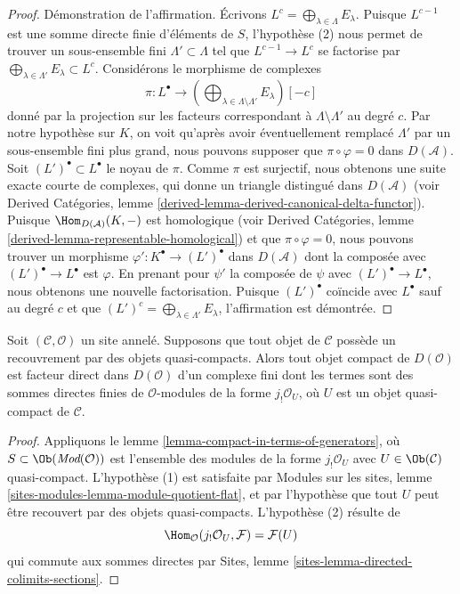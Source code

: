 \begin{proof}
\medskip\noindent
Démonstration de l'affirmation. Écrivons
$L^c = \bigoplus_{\lambda \in \Lambda} E_\lambda$. Puisque $L^{c - 1}$ est
une somme directe finie d'éléments de $S$, l'hypothèse (2) nous permet de
trouver un sous-ensemble fini $\Lambda' \subset \Lambda$ tel que
$L^{c - 1} \to L^c$ se factorise par
$\bigoplus_{\lambda \in \Lambda'} E_\lambda \subset L^c$. Considérons le
morphisme de complexes
$$
\pi :
L^\bullet
\longrightarrow
(\bigoplus\nolimits_{\lambda \in \Lambda \setminus \Lambda'} E_\lambda)[-c]
$$
donné par la projection sur les facteurs correspondant à
$\Lambda \setminus \Lambda'$ au degré $c$. Par notre hypothèse sur $K$, on
voit qu'après avoir éventuellement remplacé $\Lambda'$ par un sous-ensemble
fini plus grand, nous pouvons supposer que $\pi \circ \varphi = 0$ dans
$D(\mathcal{A})$. Soit $(L')^\bullet \subset L^\bullet$ le noyau de $\pi$.
Comme $\pi$ est surjectif, nous obtenons une suite exacte courte de complexes,
qui donne un triangle distingué dans $D(\mathcal{A})$ (voir Derived
Catégories, lemme \ref{derived-lemma-derived-canonical-delta-functor}).
Puisque $\Hom_{D(\mathcal{A})}(K, -)$ est homologique (voir Derived
Catégories, lemme \ref{derived-lemma-representable-homological}) et que
$\pi \circ \varphi = 0$, nous pouvons trouver un morphisme
$\varphi' : K^\bullet \to (L')^\bullet$ dans $D(\mathcal{A})$ dont la
composée avec $(L')^\bullet \to L^\bullet$ est $\varphi$. En prenant pour
$\psi'$ la composée de $\psi$ avec $(L')^\bullet \to L^\bullet$, nous
obtenons une nouvelle factorisation. Puisque $(L')^\bullet$ coïncide avec
$L^\bullet$ sauf au degré $c$ et que
$(L')^c = \bigoplus_{\lambda \in \Lambda'} E_\lambda$, l'affirmation est
démontrée.
\end{proof}

\begin{lemma}
\label{lemma-compact-objects-if-enough-qc}
Soit $(\mathcal{C}, \mathcal{O})$ un site annelé. Supposons que tout objet de
$\mathcal{C}$ possède un recouvrement par des objets quasi-compacts. Alors
tout objet compact de $D(\mathcal{O})$ est facteur direct dans
$D(\mathcal{O})$ d'un complexe fini dont les termes sont des sommes directes
finies de $\mathcal{O}$-modules de la forme $j_!\mathcal{O}_U$, où $U$ est un
objet quasi-compact de $\mathcal{C}$.
\end{lemma}

\begin{proof}
Appliquons le lemme \ref{lemma-compact-in-terms-of-generators}, où
$S \subset \Ob(\textit{Mod}(\mathcal{O}))$ est l'ensemble des modules de la
forme $j_!\mathcal{O}_U$ avec $U \in \Ob(\mathcal{C})$ quasi-compact.
L'hypothèse (1) est satisfaite par Modules sur les sites, lemme
\ref{sites-modules-lemma-module-quotient-flat}, et par l'hypothèse que tout
$U$ peut être recouvert par des objets quasi-compacts. L'hypothèse (2) résulte
de
$$
\Hom_\mathcal{O}(j_!\mathcal{O}_U, \mathcal{F}) = \mathcal{F}(U)
$$
qui commute aux sommes directes par Sites, lemme
\ref{sites-lemma-directed-colimits-sections}.
\end{proof}

